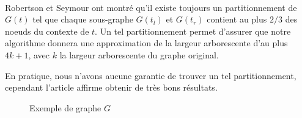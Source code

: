 \documentclass{article}
\begin{document}
\paragraph{}
Robertson et Seymour \cite{robert} ont montré qu'il existe toujours
un partitionnement de $G(t)$ tel que chaque sous-graphe $G(t_l)$ et
$G(t_r)$ contient au plus $2/3$ des noeuds du contexte de $t$.  Un
tel partitionnement permet d'assurer que notre algorithme donnera une
approximation de la largeur arborescente d'au plus $4k+1$, avec $k$ la
largeur arborescente du graphe original. 

En pratique, nous n'avons aucune garantie de trouver un tel partitionnement,
cependant l'article affirme obtenir de très bons résultats.

\newpage

\begin{figure}[H]
 \centering
{}
\caption{Exemple de graphe $G$}
\end{figure}
\end{document}
